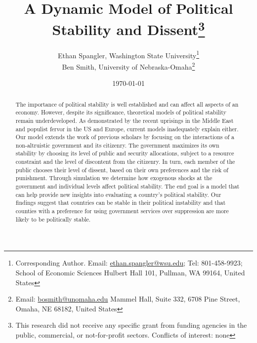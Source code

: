 \documentclass[12pt]{article}
\begin{document}
  


\begin{titlepage}






\title{A Dynamic Model of Political Stability and Dissent\footnote{This research did not receive any specific grant from funding agencies in the public, commercial, or not-for-profit sectors. Conflicts of interest: none}}

\author{
Ethan Spangler, Washington State University\footnote{Corresponding Author. Email: {\href{mailto:ethan.spangler@wsu.edu}{ethan.spangler@wsu.edu}}; Tel: 801-458-9923; School of Economic Sciences Hulbert Hall 101, Pullman, WA 99164, United States}  \\
Ben Smith, University of Nebraska-Omaha\footnote{Email: {\href{mailto:bosmith@unomaha.edu}{bosmith@unomaha.edu}} Mammel Hall, Suite 332, 6708 Pine Street, Omaha, NE 68182, United States}
}













\date{\today}
\maketitle


\begin{abstract}
\noindent The importance of political stability is well established and can affect all aspects of an economy. However, despite its significance, theoretical models of political stability remain underdeveloped. As demonstrated by the recent uprisings in the Middle East and populist fervor in the US and Europe, current models inadequately explain either. Our model extends the work of previous scholars by focusing on the interactions of a non-altruistic government and its citizenry. The government maximizes its own stability by choosing its level of public and security allocations, subject to a resource constraint and the level of discontent from the citizenry. In turn, each member of the public chooses their level of dissent, based on their own preferences and the risk of punishment. Through simulation we determine how exogenous shocks at the government and individual levels affect political stability. The end goal is a model that can help provide new insights into evaluating a country's political stability. Our findings suggest that countries can be stable in their political instability and that counties with a preference for using government services over suppression are more likely to be politically stable.      



\end{abstract}
\end{titlepage}
\end{document}
